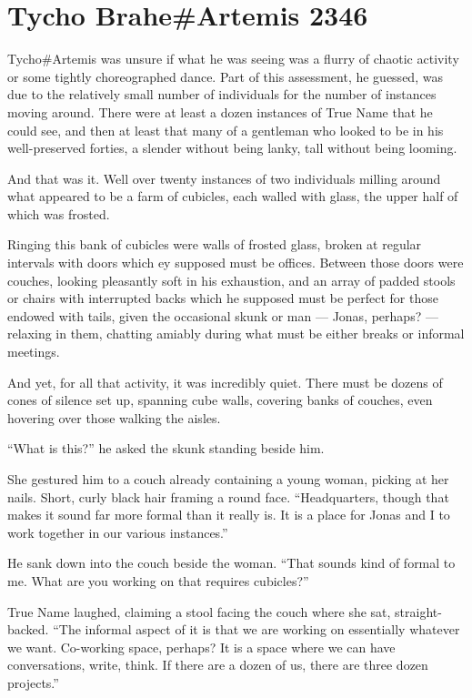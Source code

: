 \hypertarget{tycho-braheartemis-2346}{%
\chapter{Tycho Brahe\#Artemis 2346}\label{tycho-braheartemis-2346}}

Tycho\#Artemis was unsure if what he was seeing was a flurry of chaotic activity or some tightly choreographed dance. Part of this assessment, he guessed, was due to the relatively small number of individuals for the number of instances moving around. There were at least a dozen instances of True Name that he could see, and then at least that many of a gentleman who looked to be in his well-preserved forties, a slender without being lanky, tall without being looming.

And that was it. Well over twenty instances of two individuals milling around what appeared to be a farm of cubicles, each walled with glass, the upper half of which was frosted.

Ringing this bank of cubicles were walls of frosted glass, broken at regular intervals with doors which ey supposed must be offices. Between those doors were couches, looking pleasantly soft in his exhaustion, and an array of padded stools or chairs with interrupted backs which he supposed must be perfect for those endowed with tails, given the occasional skunk or man — Jonas, perhaps? — relaxing in them, chatting amiably during what must be either breaks or informal meetings.

And yet, for all that activity, it was incredibly quiet. There must be dozens of cones of silence set up, spanning cube walls, covering banks of couches, even hovering over those walking the aisles.

``What is this?'' he asked the skunk standing beside him.

She gestured him to a couch already containing a young woman, picking at her nails. Short, curly black hair framing a round face. ``Headquarters, though that makes it sound far more formal than it really is. It is a place for Jonas and I to work together in our various instances.''

He sank down into the couch beside the woman. ``That sounds kind of formal to me. What are you working on that requires cubicles?''

True Name laughed, claiming a stool facing the couch where she sat, straight-backed. ``The informal aspect of it is that we are working on essentially whatever we want. Co-working space, perhaps? It is a space where we can have conversations, write, think. If there are a dozen of us, there are three dozen projects.''

